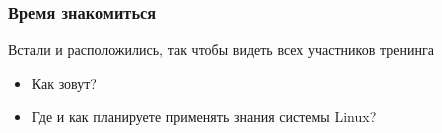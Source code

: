 \begin{frame}
\frametitle{Время знакомиться}
Встали и расположились, так чтобы видеть всех участников тренинга \\
\begin{itemize}
    \item Как зовут? 
    \item Где и как планируете применять знания системы Linux?
\end{itemize}
\end{frame}
